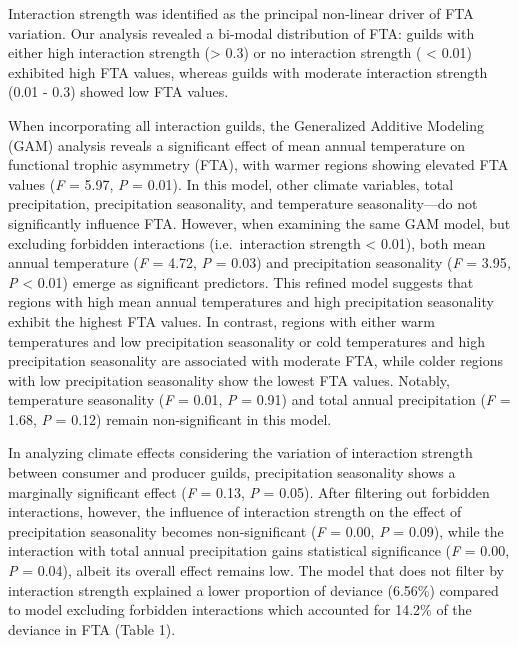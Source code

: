 \documentclass[
]{agujournal2019}
\begin{document}
Interaction strength was identified as the principal non-linear driver
of FTA variation. Our analysis revealed a bi-modal distribution of FTA:
guilds with either high interaction strength (\textgreater{} 0.3) or no
interaction strength ( \textless{} 0.01) exhibited high FTA values,
whereas guilds with moderate interaction strength (0.01 - 0.3) showed
low FTA values.

When incorporating all interaction guilds, the Generalized Additive
Modeling (GAM) analysis reveals a significant effect of mean annual
temperature on functional trophic asymmetry (FTA), with warmer regions
showing elevated FTA values (\emph{F} = 5.97, \emph{P} = 0.01). In this
model, other climate variables, total precipitation, precipitation
seasonality, and temperature seasonality---do not significantly
influence FTA. However, when examining the same GAM model, but excluding
forbidden interactions (i.e.~interaction strength \textless{} 0.01),
both mean annual temperature (\emph{F} = 4.72, \emph{P} = 0.03) and
precipitation seasonality (\emph{F} = 3.95\emph{, P} \textless{} 0.01)
emerge as significant predictors. This refined model suggests that
regions with high mean annual temperatures and high precipitation
seasonality exhibit the highest FTA values. In contrast, regions with
either warm temperatures and low precipitation seasonality or cold
temperatures and high precipitation seasonality are associated with
moderate FTA, while colder regions with low precipitation seasonality
show the lowest FTA values. Notably, temperature seasonality (\emph{F} =
0.01, \emph{P} = 0.91) and total annual precipitation (\emph{F} = 1.68,
\emph{P} = 0.12) remain non-significant in this model.

In analyzing climate effects considering the variation of interaction
strength between consumer and producer guilds, precipitation seasonality
shows a marginally significant effect (\emph{F} = 0.13, \emph{P} =
0.05). After filtering out forbidden interactions, however, the
influence of interaction strength on the effect of precipitation
seasonality becomes non-significant (\emph{F} = 0.00, \emph{P} = 0.09),
while the interaction with total annual precipitation gains statistical
significance (\emph{F} = 0.00, \emph{P} = 0.04), albeit its overall
effect remains low. The model that does not filter by interaction
strength explained a lower proportion of deviance (6.56\%) compared to
model excluding forbidden interactions which accounted for 14.2\% of the
deviance in FTA (Table 1). ~
\end{document}
